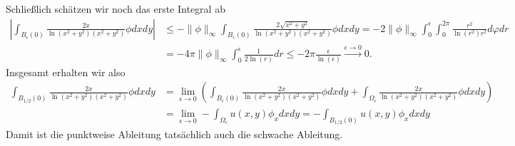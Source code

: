 \begin{solution}
Schließlich schätzen wir noch das erste Integral ab
\begin{align*}
  \left|\int_{B_\epsilon(0)}\frac{2x}{\ln(x^2+y^2)(x^2+y^2)}\phi dxdy\right|
  &\leq -\|\phi\|_\infty\int_{B_\epsilon(0)}\frac{2\sqrt{x^2 +y^2}}{\ln(x^2+y^2)(x^2+y^2)}\phi dxdy
  = -2\|\phi\|_\infty\int_0^\epsilon\int_0^{2\pi}\frac{r^2}{\ln(r^2)r^2} d\varphi dr \\
  &= -4\pi\|\phi\|_\infty\int_0^\epsilon \frac{1}{2\ln(r)} dr \leq -2\pi \frac{\epsilon}{\ln(\epsilon)}
  \xrightarrow{\epsilon \to 0} 0.
\end{align*}
Insgesamt erhalten wir also
\begin{align*}
\int_{B_{1/2}(0)}\frac{2x}{\ln(x^2+y^2)(x^2+y^2)}\phi dxdy &=
\lim_{\epsilon \to 0}\left(\int_{B_\epsilon(0)}\frac{2x}{\ln(x^2+y^2)(x^2+y^2)}\phi dxdy
+ \int_{\Omega_\epsilon}\frac{2x}{\ln(x^2+y^2)(x^2+y^2)}\phi dxdy\right) \\
&= \lim_{\epsilon \to 0}- \int_{\Omega_\epsilon}u(x,y)\phi_x dxdy
= -\int_{B_{1/2}(0)}u(x,y)\phi_x dxdy
\end{align*}
Damit ist die punktweise Ableitung tatsächlich auch die schwache Ableitung.
\end{solution}

